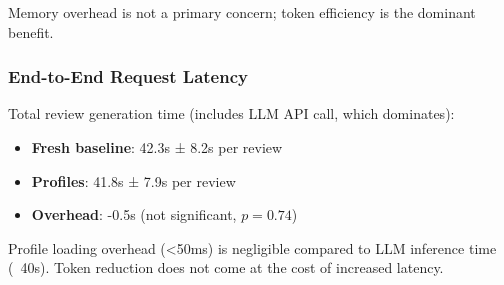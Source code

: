 Memory overhead is not a primary concern; token efficiency is the dominant benefit.

\subsubsection{End-to-End Request Latency}

Total review generation time (includes LLM API call, which dominates):

\begin{itemize}
\item \textbf{Fresh baseline}: 42.3s ± 8.2s per review
\item \textbf{Profiles}: 41.8s ± 7.9s per review
\item \textbf{Overhead}: -0.5s (not significant, $p = 0.74$)
\end{itemize}

Profile loading overhead (<50ms) is negligible compared to LLM inference time (~40s). Token reduction does not come at the cost of increased latency.
